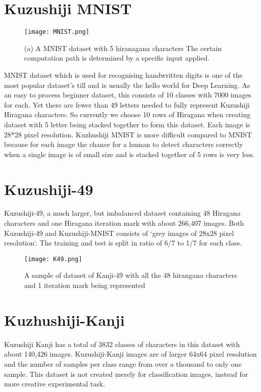 \documentclass[12pt]{report}
\begin{document}
\section{Kuzushiji MNIST}



\begin{figure}[h]
\centering
\texttt{[image: MNIST.png]}
\caption{(a) A MNIST dataset with 5 hiranagana characters
The certain computation path is determined by a specific input applied.}
\end{figure}

MNIST dataset which is used for recognising  handwritten digits is one
of the most popular dataset's till and is usually the hello world for
Deep
Learning. As an easy to process beginner dataset, this consists of 10
classes with 7000 images for each. Yet there are fewer than 49 letters
needed to fully represent Kuzushiji Hiragana characters. So currently
we choose 10 rows of Hiragana when creating dataset with 5 letter
being stacked together to form this dataset. Each image is 28*28 pixel
resolution. Kuzhushiji MNIST is more difficult compared to MNIST
because for each image the chance for a human to detect characters
correctly when a single image is of small size and is stacked together
of 5 rows is very less.


\section{Kuzushiji-49}

Kuzushiji-49, a much larger, but imbalanced dataset containing 48
Hiragana characters and one Hiragana iteration mark with about 266,407
images.
 Both Kuzushiji-49 and Kuzushiji-MNIST consists of `grey images of
28x28 pixel resolution`. The training and test is split in ratio of
6/7 to 1/7 for each class.

\begin{figure}[h]
\centering
\texttt{[image: K49.png]}
\caption{A sample of dataset of Kanji-49 with all the 48 hirangana
characters and 1 iteration mark being represented}
\end{figure}

\section{Kuzhushiji-Kanji}

Kuzushiji Kanji has a total of 3832 classes of characters  in this
dataset with about 140,426 images. Kuzushiji-Kanji images are of
larger 64x64 pixel resolution and the number of samples per class
range from over a thousand to only one sample. This dataset is not
created merely for classification images, instead for more creative
experimental task.
\end{document}

